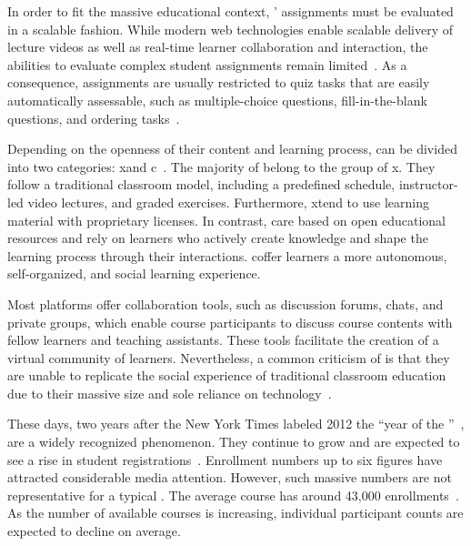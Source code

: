 In order to fit the massive educational context, \moocs' assignments must be evaluated in a scalable fashion. While modern web technologies enable scalable delivery of lecture videos as well as real-time learner collaboration and interaction, the abilities to evaluate complex student assignments remain limited~\cite{piech2013tuned}. As a consequence, \mooc assignments are usually restricted to quiz tasks that are easily automatically assessable, such as multiple-choice questions, fill-in-the-blank questions, and ordering tasks~\cite{willems2013introducing}.

Depending on the openness of their content and learning process, \moocs can be divided into two categories: x\moocs and c\moocs~\cite{grunewald2013designing}. The majority of \moocs belong to the group of x\moocs. They follow a traditional classroom model, including a predefined schedule, instructor-led video lectures, and graded exercises. Furthermore, x\moocs tend to use learning material with proprietary licenses. In contrast, c\moocs are based on open educational resources and rely on learners who actively create knowledge and shape the learning process through their interactions. c\moocs offer learners a more autonomous, self-organized, and social learning experience.

Most \mooc platforms offer collaboration tools, such as discussion forums, chats, and private groups, which enable course participants to discuss course contents with fellow learners and teaching assistants. These tools facilitate the creation of a virtual community of learners. Nevertheless, a common criticism of \moocs is that they are unable to replicate the social experience of traditional classroom education due to their massive size and sole reliance on technology~\cite{warren2014facilitating}.

These days, two years after the New York Times labeled 2012 the ``year of the \mooc''~\cite{pappano2012year}, \moocs are a widely recognized phenomenon. They continue to grow and are expected to see a rise in student registrations~\cite{chauhan2014massive}. Enrollment numbers up to six figures have attracted considerable media attention. However, such massive numbers are not representative for a typical \mooc. The average course has around 43,000 enrollments~\cite{jordan2014initial}. As the number of available courses is increasing, individual participant counts are expected to decline on average.
